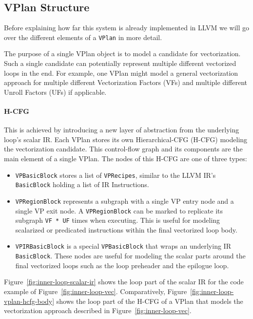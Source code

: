 \documentclass[sigplan,11pt,nonacm]{acmart}
\begin{document}
\subsection{VPlan Structure}
Before explaining how far this system is already implemented in LLVM we will go over
the different elements of a \texttt{VPlan} in more detail.

The purpose of a single VPlan object is to model a candidate for vectorization. 
Such a single candidate can potentially represent multiple different vectorized loops in the end. 
For example, one VPlan might model a general vectorization approach for multiple different 
Vectorization Factors (VFs) and multiple different Unroll Factors (UFs) if applicable.

\paragraph{H-CFG}
This is achieved by introducing a new layer of abstraction from the underlying loop's scalar IR.
Each VPlan stores its own Hierarchical-CFG (H-CFG) modeling the vectorization candidate. This 
control-flow graph and its components are the main element of a single VPlan.
The nodes of this H-CFG are one of three types:

\begin{itemize}
  \item \texttt{VPBasicBlock} stores a list of \texttt{VPRecipes}, similar to 
  the LLVM IR's \texttt{BasicBlock} holding a list of IR Instructions.
  \item \texttt{VPRegionBlock} represents a subgraph with a single VP entry node and a 
  single VP exit node. A \texttt{VPRegionBlock} can be marked to replicate its subgraph
  \texttt{VF * UF} times when executing. This is useful for modeling scalarized or predicated
  instructions within the final vectorized loop body.
  \item \texttt{VPIRBasicBlock} is a special \texttt{VPBasicBlock} that wraps an underlying
  IR \texttt{BasicBlock}. These nodes are useful for modeling the scalar parts around the 
  final vectorized loops such as the loop preheader and the epilogue loop.
\end{itemize}

Figure~\ref{fig:inner-loop-scalar-ir} shows the loop part of the scalar IR for the code example
of Figure~\ref{fig:inner-loop-vec}. Comparatively, Figure~\ref{fig:inner-loop-vplan-hcfg-body}
shows the loop part of the H-CFG of a VPlan that models the vectorization approach described
in Figure~\ref{fig:inner-loop-vec}.
\end{document}
